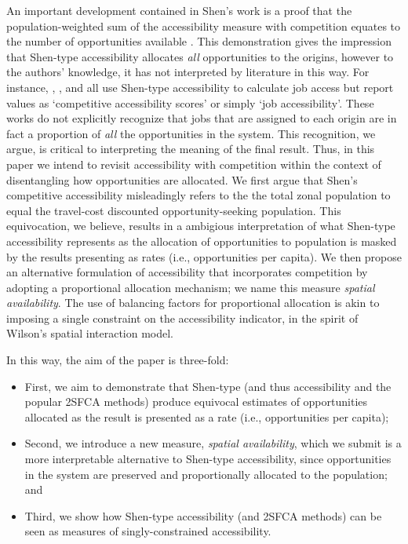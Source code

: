 \documentclass[]{elsarticle} %
\begin{document}
An important development contained in Shen's work is a proof that the
population-weighted sum of the accessibility measure with competition
equates to the number of opportunities available \citep[footnote (7) and
Appendix A in][]{shen1998}. This demonstration gives the impression that
Shen-type accessibility allocates \emph{all} opportunities to the
origins, however to the authors' knowledge, it has not interpreted by
literature in this way. For instance, \citet{hu_changing_2014},
\citet{merlin2017competition}, and \citet{tao_investigating_2020} all
use Shen-type accessibility to calculate job access but report values as
`competitive accessibility scores' or simply `job accessibility'. These
works do not explicitly recognize that jobs that are assigned to each
origin are in fact a proportion of \emph{all} the opportunities in the
system. This recognition, we argue, is critical to interpreting the
meaning of the final result. Thus, in this paper we intend to revisit
accessibility with competition within the context of disentangling how
opportunities are allocated. We first argue that Shen's competitive
accessibility misleadingly refers to the the total zonal population to
equal the travel-cost discounted opportunity-seeking population. This
equivocation, we believe, results in a ambigious interpretation of what
Shen-type accessibility represents as the allocation of opportunities to
population is masked by the results presenting as rates (i.e.,
opportunities per capita). We then propose an alternative formulation of
accessibility that incorporates competition by adopting a proportional
allocation mechanism; we name this measure \emph{spatial availability}.
The use of balancing factors for proportional allocation is akin to
imposing a single constraint on the accessibility indicator, in the
spirit of Wilson's \citeyearpar{wilson1971} spatial interaction model.

In this way, the aim of the paper is three-fold:

\begin{itemize}
\item
  First, we aim to demonstrate that Shen-type (and thus
  \citet{weibull_axiomatic_1976} accessibility and the popular 2SFCA
  methods) produce equivocal estimates of opportunities allocated as the
  result is presented as a rate (i.e., opportunities per capita);
\item
  Second, we introduce a new measure, \emph{spatial availability}, which
  we submit is a more interpretable alternative to Shen-type
  accessibility, since opportunities in the system are preserved and
  proportionally allocated to the population; and
\item
  Third, we show how Shen-type accessibility (and 2SFCA methods) can be
  seen as measures of singly-constrained accessibility.
\end{itemize}
\end{document}
